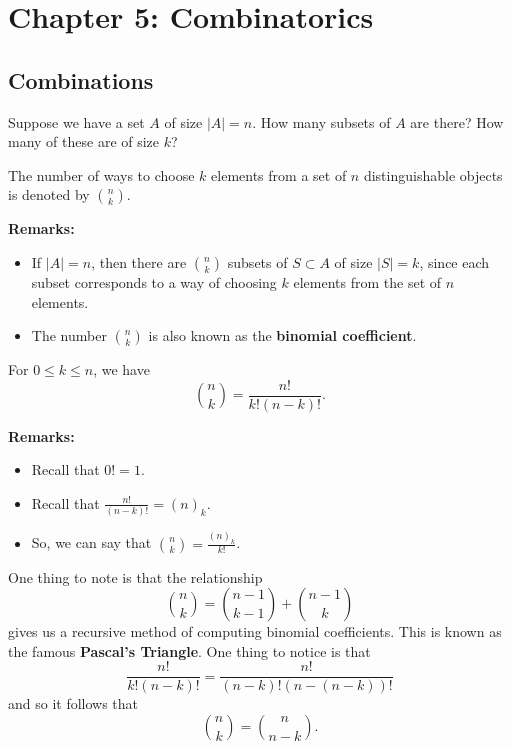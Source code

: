 \documentclass[letterpaper]{article}
\begin{document}
\section{Chapter 5: Combinatorics}
\subsection{Combinations}
Suppose we have a set $A$ of size $|A| = n$. How many subsets of $A$ are there? How many of these are of size $k$? 

\begin{definition}{}{}
    The number of ways to choose $k$ elements from a set of $n$ distinguishable objects is denoted by $\binom{n}{k}$.
\end{definition}
\textbf{Remarks:}
\begin{itemize}
    \item If $|A| = n$, then there are $\binom{n}{k}$ subsets of $S \subset A$ of size $|S| = k$, since each subset corresponds to a way of choosing $k$ elements from the set of $n$ elements. 
    \item The number $\binom{n}{k}$ is also known as the \textbf{binomial coefficient}.
\end{itemize}

\begin{theorem}{}{}
    For $0 \leq k \leq n$, we have 
    \[\binom{n}{k} = \frac{n!}{k!(n - k)!}.\]
\end{theorem}
\textbf{Remarks:}
\begin{itemize}
    \item Recall that $0! = 1$.
    \item Recall that $\frac{n!}{(n - k)!} = (n)_k$. 
    \item So, we can say that $\binom{n}{k} = \frac{(n)_k}{k!}$.
\end{itemize}
One thing to note is that the relationship 
\[\binom{n}{k} = \binom{n - 1}{k - 1} + \binom{n - 1}{k}\]
gives us a recursive method of computing binomial coefficients. This is known as the famous \textbf{Pascal's Triangle}.
One thing to notice is that 
\[\frac{n!}{k!(n - k)!} = \frac{n!}{(n - k)!(n - (n - k))!}\]
and so it follows that 
\[\binom{n}{k} = \binom{n}{n - k}.\]
\end{document}
